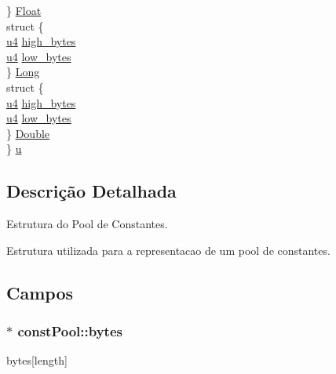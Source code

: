 \begin{DoxyCompactItemize}
\begin{tabbing}
\>\} \hyperlink{structconst_pool_aaba15c27d5b0f572a54d68643aa577fa}{Float}\\
\>struct \{\\
\>\>\hyperlink{_e___j_v_m_8h_aedf6ddc03df8caaaccbb4c60b9a9b850}{u4} \hyperlink{structconst_pool_a5c4154d878bdc78c47829c3003008bcd}{high\_bytes}\\
\>\>\hyperlink{_e___j_v_m_8h_aedf6ddc03df8caaaccbb4c60b9a9b850}{u4} \hyperlink{structconst_pool_a55d572db573fd39218d7e3233a7590fa}{low\_bytes}\\
\>\} \hyperlink{structconst_pool_a2ff4c34ed23a88cc0e355b0111ce8957}{Long}\\
\>struct \{\\
\>\>\hyperlink{_e___j_v_m_8h_aedf6ddc03df8caaaccbb4c60b9a9b850}{u4} \hyperlink{structconst_pool_a5c4154d878bdc78c47829c3003008bcd}{high\_bytes}\\
\>\>\hyperlink{_e___j_v_m_8h_aedf6ddc03df8caaaccbb4c60b9a9b850}{u4} \hyperlink{structconst_pool_a55d572db573fd39218d7e3233a7590fa}{low\_bytes}\\
\>\} \hyperlink{structconst_pool_a860c917cdbc43a11bbe5411a3329129a}{Double}\\
\} \hyperlink{structconst_pool_ab327fbd2fec182d523b180c4d941d7f5}{u}\\

\end{tabbing}\end{DoxyCompactItemize}


\subsection{Descrição Detalhada}
Estrutura do Pool de Constantes. 

Estrutura utilizada para a representacao de um pool de constantes. 

\subsection{Campos}
\hypertarget{structconst_pool_ae5e4f8056a2790c12bc61d9ba0582050}{}
\subsubsection[{bytes}]{$\ast$ const\+Pool\+::bytes}\label{structconst_pool_ae5e4f8056a2790c12bc61d9ba0582050}


bytes\mbox{[}length\mbox{]} 

